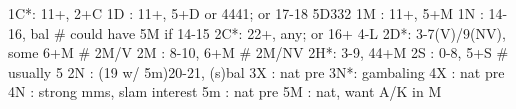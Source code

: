 1C*: 11+, 2+C
1D : 11+, 5+D or 4441; or 17-18 5D332
1M : 11+, 5+M
1N : 14-16, bal  # could have 5M if 14-15
2C*: 22+, any; or 16+ 4-L
2D*: 3-7(V)/9(NV), some 6+M
# 2M/V
2M : 8-10, 6+M
# 2M/NV
2H*: 3-9, 44+M
2S : 0-8, 5+S  # usually 5
2N : (19 w/ 5m)20-21, (s)bal
3X : nat pre
3N*: gambaling
4X : nat pre
4N : strong mms, slam interest
5m : nat pre
5M : nat, want A/K in M
